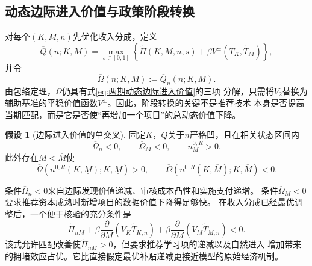\documentclass[UTF8, a4paper, 12pt, fontset=fandol]{ctexart}
\theoremstyle{definition}
\newtheorem{assumption}{假设}[section]
\theoremstyle{remark}
\begin{document}
\subsection{动态边际进入价值与政策阶段转换}
对每个$(K,M,n)$先优化收入分成，定义
\begin{equation}
  \overline Q(n;K,M)
  =\max_{s\in[0,1]}
  \left\{
    \widetilde\Pi(K,M,n,s)
    +\beta V^{\pm}(\widetilde T_K,\widetilde T_M)
  \right\},
  \label{eq:约化目标进入价值}
\end{equation}
并令
\begin{equation}
  \overline\Omega(n;K,M)
  :=\overline Q_n(n;K,M).
  \label{eq:无限期边际进入价值}
\end{equation}
由包络定理，$\overline\Omega$仍具有式\eqref{eq:两期动态边际进入价值}的三项
分解，只需将$V_2$替换为辅助基准的平稳价值函数$V^{\pm}$。因此，阶段转换的关键不是推荐技术
本身是否提高当期匹配，而是它是否使“再增加一个项目”的总动态价值下降。

\begin{assumption}[边际进入价值的单交叉]
  \label{ass:边际进入单交叉}
  固定$K$，$\overline Q$关于$n$严格凹，且在相关状态区间内
  \begin{equation}
    \overline\Omega_n<0,
    \qquad
    \overline\Omega_M<0,
    \qquad
    n_M^{0,R}>0.
    \label{eq:边际进入单交叉条件}
  \end{equation}
  此外存在$\underline M<\overline M$使
  \begin{equation}
    \overline\Omega\!\left(n^{0,R}(K,\underline M);K,\underline M\right)>0,
    \qquad
    \overline\Omega\!\left(n^{0,R}(K,\overline M);K,\overline M\right)<0.
    \label{eq:边界穿越条件}
  \end{equation}
\end{assumption}
条件$\overline\Omega_n<0$来自边际发现价值递减、审核成本凸性和实施支付递增。
条件$\overline\Omega_M<0$要求推荐资本成熟时新增项目的数据价值下降得足够快。
在收入分成已经最优调整后，一个便于核验的充分条件是
\begin{equation}
  \widetilde\Pi_{nM}
  +\beta\frac{\partial}{\partial M}
    \left(V^{\pm}_K\widetilde T_{K,n}\right)
  +\beta\frac{\partial}{\partial M}
    \left(V^{\pm}_M\widetilde T_{M,n}\right)<0.
  \label{eq:原始分量充分条件}
\end{equation}
该式允许匹配改善使$\widetilde\Pi_{nM}>0$，但要求推荐学习项的递减以及自然进入
增加带来的拥堵效应占优。它比直接假定最优补贴递减更接近模型的原始经济机制。
\end{document}
